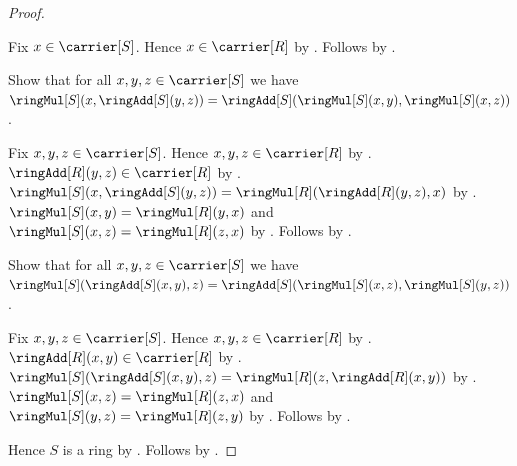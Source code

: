 \begin{proof}
    \begin{subproof}
        Fix $x\in\carrier[S]$.
        Hence $x\in\carrier[R]$ by \auto.
        Follows by
            .
    \end{subproof}
    Show that for all $x,y,z\in\carrier[S]$ we have
        $\ringMul[S](x,\ringAdd[S](y,z))
            =\ringAdd[S](\ringMul[S](x,y),\ringMul[S](x,z))$.
    \begin{subproof}
        Fix $x,y,z\in\carrier[S]$.
        Hence $x,y,z\in\carrier[R]$ by \auto.
        $\ringAdd[R](y,z)\in\carrier[R]$ by
            .
        $\ringMul[S](x,\ringAdd[S](y,z))
            =\ringMul[R](\ringAdd[R](y,z),x)$ by
            .
        $\ringMul[S](x,y)=\ringMul[R](y,x)$ and
            $\ringMul[S](x,z)=\ringMul[R](z,x)$ by
            .
        Follows by .
    \end{subproof}
    Show that for all $x,y,z\in\carrier[S]$ we have
        $\ringMul[S](\ringAdd[S](x,y),z)
            =\ringAdd[S](\ringMul[S](x,z),\ringMul[S](y,z))$.
    \begin{subproof}
        Fix $x,y,z\in\carrier[S]$.
        Hence $x,y,z\in\carrier[R]$ by \auto.
        $\ringAdd[R](x,y)\in\carrier[R]$ by
            .
        $\ringMul[S](\ringAdd[S](x,y),z)
            =\ringMul[R](z,\ringAdd[R](x,y))$ by
            .
        $\ringMul[S](x,z)=\ringMul[R](z,x)$ and
            $\ringMul[S](y,z)=\ringMul[R](z,y)$ by
            .
        Follows by .
    \end{subproof}
    Hence $S$ is a ring by
        .
    Follows by .
\end{proof}

